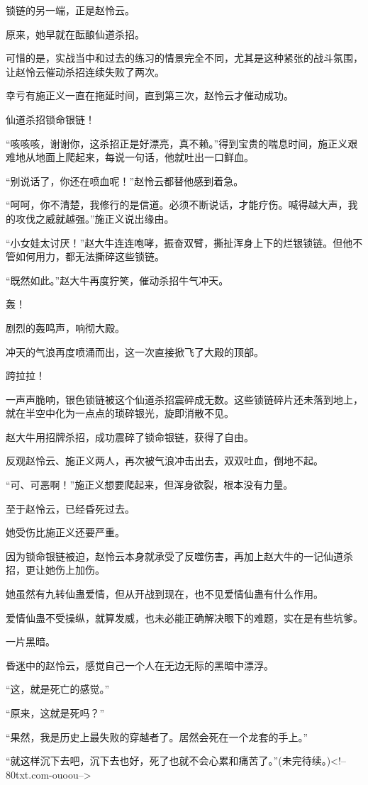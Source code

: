 \begin{this_body}
锁链的另一端，正是赵怜云。

原来，她早就在酝酿仙道杀招。

可惜的是，实战当中和过去的练习的情景完全不同，尤其是这种紧张的战斗氛围，让赵怜云催动杀招连续失败了两次。

幸亏有施正义一直在拖延时间，直到第三次，赵怜云才催动成功。

仙道杀招锁命银链！

“咳咳咳，谢谢你，这杀招正是好漂亮，真不赖。”得到宝贵的喘息时间，施正义艰难地从地面上爬起来，每说一句话，他就吐出一口鲜血。

“别说话了，你还在喷血呢！”赵怜云都替他感到着急。

“呵呵，你不清楚，我修行的是信道。必须不断说话，才能疗伤。喊得越大声，我的攻伐之威就越强。”施正义说出缘由。

“小女娃太讨厌！”赵大牛连连咆哮，振奋双臂，撕扯浑身上下的烂银锁链。但他不管如何用力，都无法撕碎这些锁链。

“既然如此。”赵大牛再度狞笑，催动杀招牛气冲天。

轰！

剧烈的轰鸣声，响彻大殿。

冲天的气浪再度喷涌而出，这一次直接掀飞了大殿的顶部。

跨拉拉！

一声声脆响，银色锁链被这个仙道杀招震碎成无数。这些锁链碎片还未落到地上，就在半空中化为一点点的琐碎银光，旋即消散不见。

赵大牛用招牌杀招，成功震碎了锁命银链，获得了自由。

反观赵怜云、施正义两人，再次被气浪冲击出去，双双吐血，倒地不起。

“可、可恶啊！”施正义想要爬起来，但浑身欲裂，根本没有力量。

至于赵怜云，已经昏死过去。

她受伤比施正义还要严重。

因为锁命银链被迫，赵怜云本身就承受了反噬伤害，再加上赵大牛的一记仙道杀招，更让她伤上加伤。

她虽然有九转仙蛊爱情，但从开战到现在，也不见爱情仙蛊有什么作用。

爱情仙蛊不受操纵，就算发威，也未必能正确解决眼下的难题，实在是有些坑爹。

一片黑暗。

昏迷中的赵怜云，感觉自己一个人在无边无际的黑暗中漂浮。

“这，就是死亡的感觉。”

“原来，这就是死吗？”

“果然，我是历史上最失败的穿越者了。居然会死在一个龙套的手上。”

“就这样沉下去吧，沉下去也好，死了也就不会心累和痛苦了。”(未完待续。)<!--80txt.com-ouoou-->

\end{this_body}


